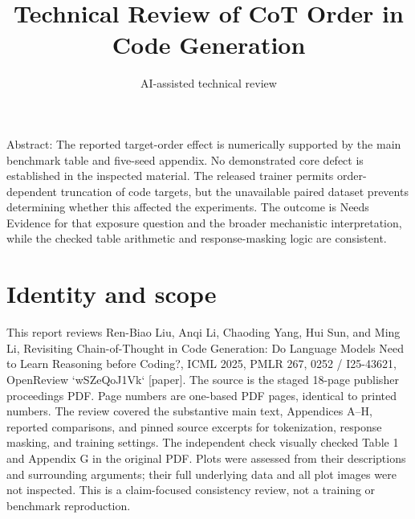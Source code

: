 \documentclass[10pt]{article}
\title{Technical Review of
CoT Order in Code Generation}
\author{AI-assisted technical review}
\date{}
\begin{document}
\maketitle
Abstract: The reported target-order effect is numerically supported by the main benchmark table and five-seed appendix. No demonstrated core defect is established in the inspected material. The released trainer permits order-dependent truncation of code targets, but the unavailable paired dataset prevents determining whether this affected the experiments. The outcome is Needs Evidence for that exposure question and the broader mechanistic interpretation, while the checked table arithmetic and response-masking logic are consistent.\par
\section*{Identity and scope}
This report reviews Ren-Biao Liu, Anqi Li, Chaoding Yang, Hui Sun, and Ming Li, Revisiting Chain-of-Thought in Code Generation: Do Language Models Need to Learn Reasoning before Coding?, ICML 2025, PMLR 267, 0252 / I25-43621, OpenReview `wSZeQoJ1Vk` [paper]. The source is the staged 18-page publisher proceedings PDF. Page numbers are one-based PDF pages, identical to printed numbers. The review covered the substantive main text, Appendices A–H, reported comparisons, and pinned source excerpts for tokenization, response masking, and training settings. The independent check visually checked Table 1 and Appendix G in the original PDF. Plots were assessed from their descriptions and surrounding arguments; their full underlying data and all plot images were not inspected. This is a claim-focused consistency review, not a training or benchmark reproduction.\par
\end{document}
